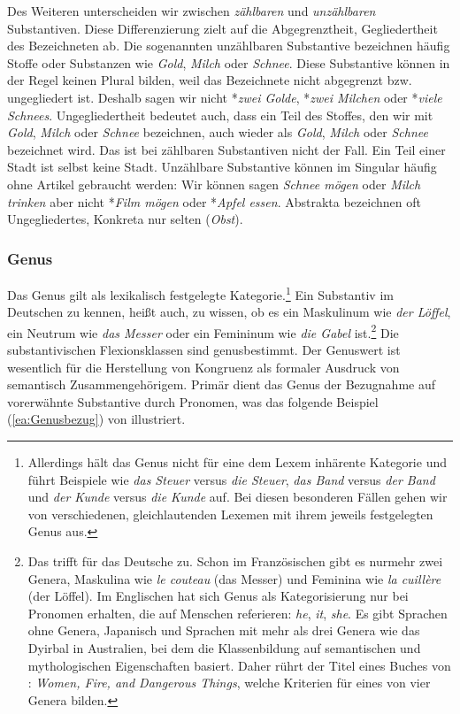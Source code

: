 Des Weiteren unterscheiden wir zwischen \textit{zählbaren} und \textit{unzählbaren} Substantiven. Diese Differenzierung zielt auf die Abgegrenztheit, Gegliedertheit des Bezeichneten ab. Die sogenannten unzählbaren Substantive bezeichnen häufig Stoffe oder Substanzen wie \textit{Gold}, \textit{Milch} oder \textit{Schnee}. Diese Substantive können in der Regel keinen Plural bilden, weil das Bezeichnete nicht abgegrenzt bzw. ungegliedert ist. Deshalb sagen wir nicht *\textit{zwei Golde}, *\textit{zwei Milchen} oder *\textit{viele Schnees}. Ungegliedertheit bedeutet auch, dass ein Teil des Stoffes, den wir mit \textit{Gold}, \textit{Milch} oder \textit{Schnee} bezeichnen, auch wieder als \textit{Gold}, \textit{Milch} oder \textit{Schnee} bezeichnet wird. Das ist bei zählbaren Substantiven nicht der Fall. Ein Teil einer Stadt ist selbst keine Stadt. Unzählbare Substantive können im Singular häufig ohne Artikel gebraucht werden: Wir können sagen \textit{Schnee mögen} oder \textit{Milch trinken} aber nicht *\textit{Film mögen} oder *\textit{Apfel essen}. Abstrakta bezeichnen oft Ungegliedertes, Konkreta nur selten (\zB \textit{Obst}).


\subsubsection{Genus}\label{subsubsection:Genus}

Das Genus gilt als lexikalisch festgelegte Kategorie.\footnote{Allerdings hält \citet[27]{Agel1996} das Genus nicht für eine dem Lexem inhärente Kategorie und führt Beispiele wie \textit{das Steuer} versus \textit{die Steuer}, \textit{das Band} versus \textit{der Band} und \textit{der Kunde} versus \textit{die Kunde} auf. Bei diesen besonderen Fällen gehen wir von verschiedenen, gleichlautenden Lexemen mit ihrem jeweils festgelegten Genus aus.} Ein Substantiv im Deutschen zu kennen, heißt auch, zu wissen, ob es ein Maskulinum wie \textit{der Löffel}, ein Neutrum wie \textit{das Messer} oder ein Femininum wie \textit{die Gabel} ist.\footnote{Das trifft für das Deutsche zu. Schon im Französischen gibt es nurmehr zwei Genera, Maskulina wie \textit{le couteau} (das Messer) und Feminina wie \textit{la cuillère} (der Löffel). Im Englischen hat sich Genus als Kategorisierung nur bei Pronomen erhalten, die auf Menschen referieren: \textit{he}, \textit{it}, \textit{she}. Es gibt Sprachen ohne Genera, \zB Japanisch und Sprachen mit mehr als drei Genera wie das Dyirbal in Australien, bei dem die Klassenbildung auf semantischen und mythologischen Eigenschaften basiert. Daher rührt der Titel eines Buches von \citet{Lakoff1987}: \textit{Women, Fire, and Dangerous Things}, welche Kriterien für eines von vier Genera bilden.} Die substantivischen Flexionsklassen sind genusbestimmt. Der Genuswert ist wesentlich für die Herstellung von Kongruenz als formaler Ausdruck von semantisch Zusammengehörigem. Primär dient das Genus der Bezugnahme auf vorerwähnte Substantive durch Pronomen, was das folgende Beispiel (\ref{ea:Genusbezug}) von \citet[43]{Koepcke_Zubin1984} illustriert.

